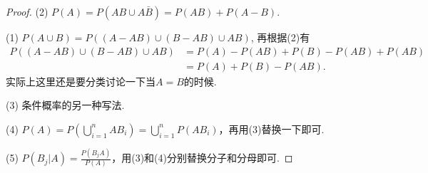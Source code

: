\documentclass{article}
\begin{document}
\begin{proof}
(2) $P(A) = P(AB \cup A\bar{B}) = P(AB)+P(A-B).$

(1) $P(A \cup B) = P((A-AB) \cup (B-AB) \cup AB)$, 再根据(2)有
$$
\begin{array}{ll}
P((A-AB) \cup (B-AB) \cup AB) &= P(A)-P(AB) + P(B) - P(AB) + P(AB) \\
&= P(A) + P(B) -P(AB).
\end{array}
$$
{\color{blue} 实际上这里还是要分类讨论一下当$A=B$的时候.}

(3) 条件概率的另一种写法.

(4) $P(A) = P(\bigcup\limits_{i=1}^n AB_i) = \bigcup\limits_{i=1}^n P(AB_i)$，再用(3)替换一下即可.

(5) $P(B_j | A) =  \frac{P(B_jA)}{P(A)}$，用(3)和(4)分别替换分子和分母即可.
\end{proof}
\end{document}
